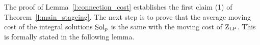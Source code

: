 \noindent
The proof of Lemma~\ref{l:connection_cost} establishes the first claim (1) of Theorem~\ref{l:main_stageing}.
The next step is to prove that the average moving cost of the integral solutions $\mathrm{Sol}_p$ is the same with the moving cost of $\mathrm{Z}_{\mathrm{LP}}$. This is formally stated in the following lemma.




